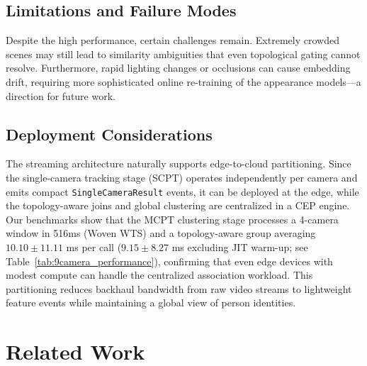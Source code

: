 \documentclass[11pt]{article}
\begin{document}
\subsection{Limitations and Failure Modes}
Despite the high performance, certain challenges remain. Extremely crowded scenes may still lead to similarity ambiguities that even topological gating cannot resolve. Furthermore, rapid lighting changes or occlusions can cause embedding drift, requiring more sophisticated online re-training of the appearance models—a direction for future work.

\subsection{Deployment Considerations}
The streaming architecture naturally supports edge-to-cloud partitioning. Since the single-camera tracking stage (SCPT) operates independently per camera and emits compact \texttt{SingleCameraResult} events, it can be deployed at the edge, while the topology-aware joins and global clustering are centralized in a CEP engine. Our benchmarks show that the MCPT clustering stage processes a 4-camera window in 516ms (Woven WTS) and a topology-aware group averaging $10.10 \pm 11.11$ ms per call ($9.15 \pm 8.27$ ms excluding JIT warm-up; see Table~\ref{tab:9camera_performance}), confirming that even edge devices with modest compute can handle the centralized association workload. This partitioning reduces backhaul bandwidth from raw video streams to lightweight feature events while maintaining a global view of person identities.

\section{Related Work}\label{sec:related}
\end{document}
